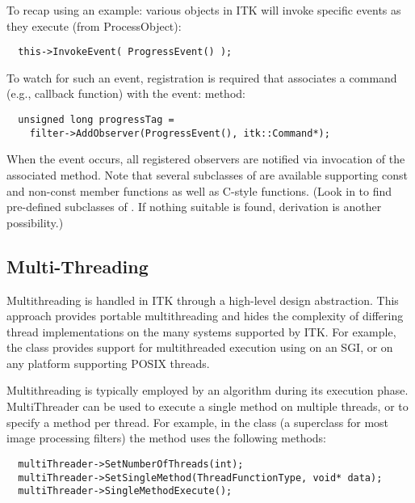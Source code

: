 To recap using an example: various objects in ITK will invoke specific events
as they execute (from ProcessObject):
\small
\begin{verbatim}
  this->InvokeEvent( ProgressEvent() );
\end{verbatim}
\normalsize

To watch for such an event, registration is required that associates a
command (e.g., callback function) with the event:
 method:
\small
\begin{verbatim}
  unsigned long progressTag =
    filter->AddObserver(ProgressEvent(), itk::Command*);
\end{verbatim}
\normalsize

When the event occurs, all registered observers are notified via invocation
of the associated  method. Note that several
subclasses of  are available supporting const and
non-const member functions as well as C-style functions. (Look in
 to find pre-defined subclasses of
. If nothing suitable is found, derivation is another
possibility.)

\subsection{Multi-Threading}
\label{sec:MultiThreading}

Multithreading is handled in ITK through a high-level design
abstraction. This approach provides portable multithreading and hides the
complexity of differing thread implementations on the many systems supported
by ITK. For example, the class  provides support for
multithreaded execution using  on an SGI, or
 on any platform supporting POSIX threads.

Multithreading is typically employed by an algorithm during its execution
phase. MultiThreader can be used to execute a single method on
multiple threads, or to specify a method per thread. For example, in the
class  (a superclass for most image processing filters)
the  method uses the following methods:

\small
\begin{verbatim}
  multiThreader->SetNumberOfThreads(int);
  multiThreader->SetSingleMethod(ThreadFunctionType, void* data);
  multiThreader->SingleMethodExecute();
\end{verbatim}
\normalsize

